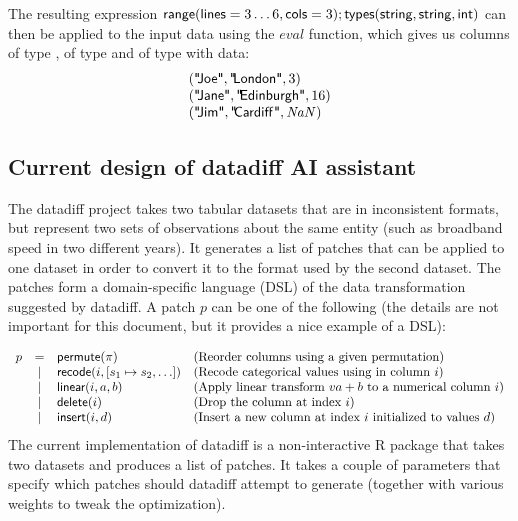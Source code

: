 \documentclass{article}
\begin{document}
The resulting expression 
$\textnormal{\sffamily range}(\textnormal{\sffamily lines}=3\ldots 6, \textnormal{\sffamily cols}=3); \textnormal{\sffamily types}(\textnormal{\sffamily string},\textnormal{\sffamily string},\textnormal{\sffamily int})$
can then be applied to the input data using the $\mathit{eval}$ function, which gives us 
columns  of type ,  of type 
and  of type  with data:
%
\begin{equation*}
\begin{array}{l}
(\textnormal{\sffamily "\hspace{-0.2em}Joe"}, \textnormal{\sffamily "\hspace{-0.2em}London"}, 3)\\
(\textnormal{\sffamily "\hspace{-0.2em}Jane"}, \textnormal{\sffamily "\hspace{-0.2em}Edinburgh"}, 16)\\
(\textnormal{\sffamily "\hspace{-0.2em}Jim"}, \textnormal{\sffamily "\hspace{-0.2em}Cardiff\hspace{0.1em}"}, \mathit{NaN})
\end{array}
\end{equation*}

\subsection{Current design of datadiff AI assistant}

The datadiff project takes two tabular datasets that are in inconsistent formats, but represent
two sets of observations about the same entity (such as broadband speed in two different years).
It generates a list of patches that can be applied to one dataset in order to convert it to the
format used by the second dataset. The patches form a domain-specific language (DSL) of the 
data transformation suggested by datadiff. A patch $p$ can be one of the following
(the details are not important for this document, but it provides a nice example of a DSL):

\begin{equation*}
\begin{array}{lcll}
p &=& \textnormal{\sffamily permute}(\pi) &\textnormal{(Reorder columns using a given permutation)}\\
  &|& \textnormal{\sffamily recode}(i, [s_1\mapsto s_2, \ldots]) &\textnormal{(Recode categorical values using in column $i$)}\\
  &|& \textnormal{\sffamily linear}(i, a, b)&\textnormal{(Apply linear transform $va+b$ to a numerical column $i$)}\\
  &|& \textnormal{\sffamily delete}(i)&\textnormal{(Drop the column at index $i$)}\\
  &|& \textnormal{\sffamily insert}(i, d)&\textnormal{(Insert a new column at index $i$ initialized to values $d$)}
\end{array}
\end{equation*}
%
The current implementation of datadiff is a non-interactive R package that takes two datasets
and produces a list of patches. It takes a couple of parameters that specify which patches should
datadiff attempt to generate (together with various weights to tweak the optimization).
\end{document}
